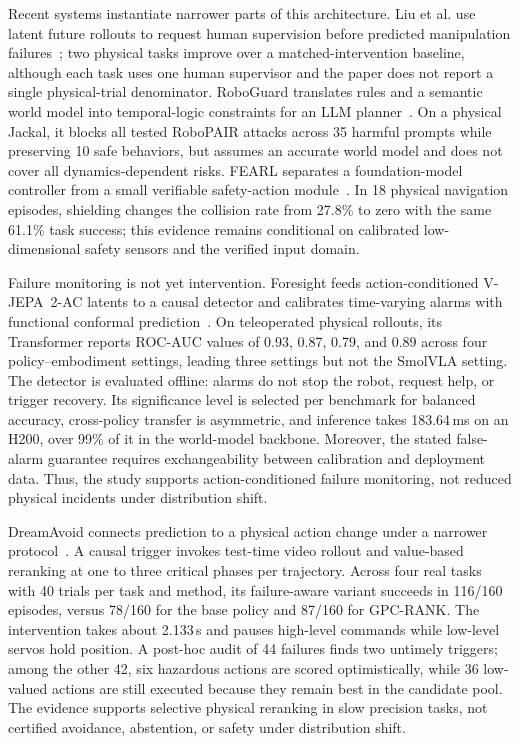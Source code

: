 Recent systems instantiate narrower parts of this architecture. Liu et al. use latent future rollouts to request human supervision before predicted manipulation failures~\cite{liu2024runtime}; two physical tasks improve over a matched-intervention baseline, although each task uses one human supervisor and the paper does not report a single physical-trial denominator. RoboGuard translates rules and a semantic world model into temporal-logic constraints for an LLM planner~\cite{ravichandran2026roboguard}. On a physical Jackal, it blocks all tested RoboPAIR attacks across 35 harmful prompts while preserving 10 safe behaviors, but assumes an accurate world model and does not cover all dynamics-dependent risks. FEARL separates a foundation-model controller from a small verifiable safety-action module~\cite{corsi2026fearl}. In 18 physical navigation episodes, shielding changes the collision rate from 27.8\% to zero with the same 61.1\% task success; this evidence remains conditional on calibrated low-dimensional safety sensors and the verified input domain.

Failure monitoring is not yet intervention. Foresight feeds action-conditioned V-JEPA~2-AC latents to a causal detector and calibrates time-varying alarms with functional conformal prediction~\cite{zhang2026foresight}. On teleoperated physical rollouts, its Transformer reports ROC-AUC values of 0.93, 0.87, 0.79, and 0.89 across four policy--embodiment settings, leading three settings but not the SmolVLA setting. The detector is evaluated offline: alarms do not stop the robot, request help, or trigger recovery. Its significance level is selected per benchmark for balanced accuracy, cross-policy transfer is asymmetric, and inference takes 183.64\,ms on an H200, over 99\% of it in the world-model backbone. Moreover, the stated false-alarm guarantee requires exchangeability between calibration and deployment data. Thus, the study supports action-conditioned failure monitoring, not reduced physical incidents under distribution shift.

DreamAvoid connects prediction to a physical action change under a narrower protocol~\cite{fan2026dreamavoid}. A causal trigger invokes test-time video rollout and value-based reranking at one to three critical phases per trajectory. Across four real tasks with 40 trials per task and method, its failure-aware variant succeeds in 116/160 episodes, versus 78/160 for the base policy and 87/160 for GPC-RANK. The intervention takes about 2.133\,s and pauses high-level commands while low-level servos hold position. A post-hoc audit of 44 failures finds two untimely triggers; among the other 42, six hazardous actions are scored optimistically, while 36 low-valued actions are still executed because they remain best in the candidate pool. The evidence supports selective physical reranking in slow precision tasks, not certified avoidance, abstention, or safety under distribution shift.

